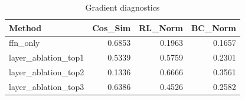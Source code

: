 \begin{table}[htbp]
\centering
\caption{Gradient diagnostics}
\label{tab:grad-diag}
\begin{tabular}{lrrr}
\toprule
\textbf{Method} & \textbf{Cos\_Sim} & \textbf{RL\_Norm} & \textbf{BC\_Norm} \\
\midrule
ffn\_only & 0.6853 & 0.1963 & 0.1657 \\
layer\_ablation\_top1 & 0.5339 & 0.5759 & 0.2301 \\
layer\_ablation\_top2 & 0.1336 & 0.6666 & 0.3561 \\
layer\_ablation\_top3 & 0.6386 & 0.4526 & 0.2582 \\
\bottomrule
\end{tabular}
\end{table}